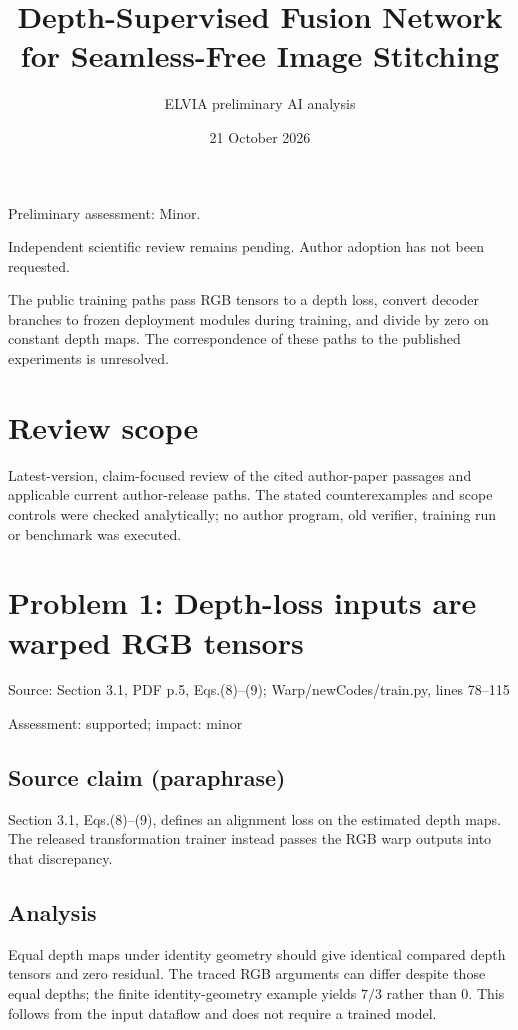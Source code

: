 \documentclass[11pt]{article}
\begin{document}
\title{Depth-Supervised Fusion Network for Seamless-Free Image Stitching}

\author{ELVIA preliminary AI analysis}\date{21 October 2026}\maketitle

Preliminary assessment: Minor.\par

Independent scientific review remains pending. Author adoption has not been requested.

The public training paths pass RGB tensors to a depth loss, convert decoder branches to frozen deployment modules during training, and divide by zero on constant depth maps. The correspondence of these paths to the published experiments is unresolved.

\section*{Review scope}

Latest-version, claim-focused review of the cited author-paper passages and applicable current author-release paths. The stated counterexamples and scope controls were checked analytically; no author program, old verifier, training run or benchmark was executed.

\section*{Problem 1: Depth-loss inputs are warped RGB tensors}

Source: Section 3.1, PDF p.5, Eqs.(8)–(9); Warp/newCodes/train.py, lines 78–115

Assessment: supported; impact: minor

\subsection*{Source claim (paraphrase)}

Section 3.1, Eqs.(8)–(9), defines an alignment loss on the estimated depth maps. The released transformation trainer instead passes the RGB warp outputs into that discrepancy.

\subsection*{Analysis}

Equal depth maps under identity geometry should give identical compared depth tensors and zero residual. The traced RGB arguments can differ despite those equal depths; the finite identity-geometry example yields \(7/3\) rather than \(0\). This follows from the input dataflow and does not require a trained model.
\end{document}
